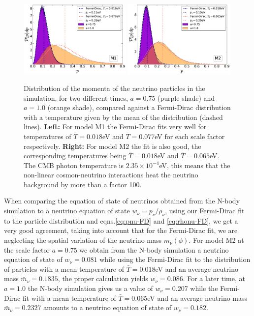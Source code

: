 \begin{figure}
\begin{centering}
\includegraphics[width=0.49\textwidth]{Chapters/gnq/figures/momentum-Histogram-FD-model1-v4}
\includegraphics[width=0.49\textwidth]{Chapters/gnq/figures/momentum-Histogram-FD-model2-v4} 
\par\end{centering}
\caption[Histogram of neutrino momenta from simulations against the Fermi-Dirac distribution.]{\label{fig:histogram-FermiD-1} Distribution of the momenta of the
neutrino particles in the simulation, for two different times, $a=0.75$
(purple shade) and $a=1.0$ (orange shade), compared against a Fermi-Dirac
distribution with a temperature given by the mean of the distribution
(dashed lines). \textbf{Left: }For model M1 the Fermi-Dirac fits very
well for temperatures of $\bar{T}=0.018$eV and $\bar{T}=0.077$eV
for each scale factor respectively. \textbf{Right: }For model M2 the
fit is also good, the corresponding temperatures being $\bar{T}=0.018$eV
and $\bar{T}=0.065$eV. The CMB photon temperature is $2.35\times10^{-4}$eV,
this means that the non-linear cosmon-neutrino interactions heat the
neutrino background by more than a factor 100.}
\end{figure}


When comparing the equation of state of neutrinos obtained from the
N-body simulation to a neutrino equation of state $w_{\nu}=p_{\nu}/\rho_{\nu}$,
using our Fermi-Dirac fit to the particle distribution and eqns.\ref{eq:pnu-FD}
and \ref{eq:rhonu-FD}, we get a very good agreement, taking
into account that for the Fermi-Dirac fit, we are neglecting the spatial
variation of the neutrino mass $m_{\nu}(\phi)$. For model M2 at the
scale factor $a=0.75$ we obtain from the N-body simulation a neutrino
equation of state of $w_{\nu}=0.081$ while using the Fermi-Dirac
fit to the distribution of particles with a mean temperature of $\bar{T}=0.018$eV
and an average neutrino mass $\bar{m}_{\nu}=0.1835$, the proper calculation
yields $w_{\nu}=0.086$. For a later time, at $a=1.0$ the N-body
simulation gives us a value of $w_{\nu}=0.207$ while the Fermi-Dirac
fit with a mean temperature of $\bar{T}=0.065$eV and an average neutrino
mass $\bar{m}_{\nu}=0.2327$ amounts to a neutrino equation of state
of $w_{\nu}=0.182$.


